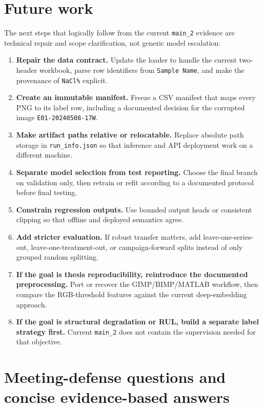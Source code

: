 \documentclass[11pt]{article}
\begin{document}
\section{Future work}

The next steps that logically follow from the current \texttt{main\_2} evidence are technical repair and scope clarification, not generic model escalation:
\begin{enumerate}
  \item \textbf{Repair the data contract.} Update the loader to handle the current two-header workbook, parse row identifiers from \texttt{Sample Name}, and make the provenance of \texttt{NaCl\%} explicit.
  \item \textbf{Create an immutable manifest.} Freeze a CSV manifest that maps every PNG to its label row, including a documented decision for the corrupted image \texttt{E01-20240508-17W}.
  \item \textbf{Make artifact paths relative or relocatable.} Replace absolute path storage in \texttt{run\_info.json} so that inference and API deployment work on a different machine.
  \item \textbf{Separate model selection from test reporting.} Choose the final branch on validation only, then retrain or refit according to a documented protocol before final testing.
  \item \textbf{Constrain regression outputs.} Use bounded output heads or consistent clipping so that offline and deployed semantics agree.
  \item \textbf{Add stricter evaluation.} If robust transfer matters, add leave-one-series-out, leave-one-treatment-out, or campaign-forward splits instead of only grouped random splitting.
  \item \textbf{If the goal is thesis reproducibility, reintroduce the documented preprocessing.} Port or recover the GIMP/BIMP/MATLAB workflow, then compare the RGB-threshold features against the current deep-embedding approach.
  \item \textbf{If the goal is structural degradation or RUL, build a separate label strategy first.} Current \texttt{main\_2} does not contain the supervision needed for that objective.
\end{enumerate}

\appendix

\section{Meeting-defense questions and concise evidence-based answers}
\end{document}
